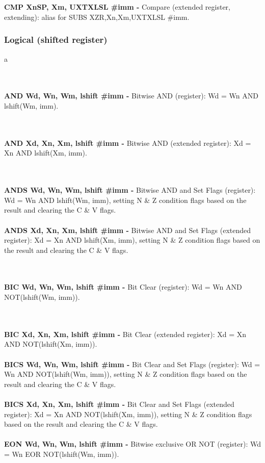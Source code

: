 \documentclass[12pt,a4paper,utf8]{ppgsi}
\begin{document}
\\\\\textbf{CMP Xn\textbar SP, Xm{, UXTX\textbar LSL \#imm} -} Compare (extended register, extending): alias for SUBS XZR,Xn,Xm{,UXTX\textbar LSL \#imm}. 



\subsubsection{Logical (shifted register)}
a

\\\\\textbf{AND Wd, Wn, Wm{, lshift \#imm} -} Bitwise AND (register): Wd = Wn AND lshift(Wm, imm). 

\\\\\textbf{AND Xd, Xn, Xm{, lshift \#imm} -} Bitwise AND (extended register): Xd = Xn AND lshift(Xm, imm). 

\\\\\textbf{ANDS Wd, Wn, Wm{, lshift \#imm} -} Bitwise AND and Set Flags (register): Wd = Wn AND lshift(Wm, imm), setting N \& Z condition flags
based on the result and clearing the C \& V flags. 
\\\\\textbf{ANDS Xd, Xn, Xm{, lshift \#imm} -} Bitwise AND and Set Flags (extended register): Xd = Xn AND lshift(Xm, imm), setting N \& Z
condition flags based on the result and clearing the C \& V flags. 

\\\\\textbf{BIC Wd, Wn, Wm{, lshift \#imm} -} Bit Clear (register): Wd = Wn AND NOT(lshift(Wm, imm)). 

\\\\\textbf{BIC Xd, Xn, Xm{, lshift \#imm} -} Bit Clear (extended register): Xd = Xn AND NOT(lshift(Xm, imm)). 
\\\\\textbf{BICS Wd, Wn, Wm{, lshift \#imm} -} Bit Clear and Set Flags (register): Wd = Wn AND NOT(lshift(Wm, imm)), setting N \& Z condition
flags based on the result and clearing the C \& V flags. 
\\\\\textbf{BICS Xd, Xn, Xm{, lshift \#imm} -} Bit Clear and Set Flags (extended register): Xd = Xn AND NOT(lshift(Xm, imm)), setting N \& Z
condition flags based on the result and clearing the C \& V flags. 
\\\\\textbf{EON Wd, Wn, Wm{, lshift \#imm} -} Bitwise exclusive OR NOT (register): Wd = Wn EOR NOT(lshift(Wm, imm)). 
\end{document}
